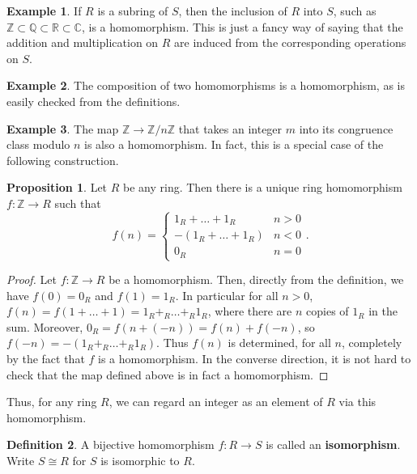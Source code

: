 \documentclass{article}
\newcommand{\Z}{\mathbb{Z}}
\newcommand{\Q}{\mathbb{Q}}
\newcommand{\R}{\mathbb{R}}
\newcommand{\C}{\mathbb{C}}
\newcommand{\rb}[1]{\left( #1 \right)}
\theoremstyle{definition}\newtheorem{definition}{Definition}[section]
\theoremstyle{definition}\newtheorem{remark}[definition]{Remark}
\theoremstyle{definition}\newtheorem*{example}{Example}
\theoremstyle{definition}\newtheorem*{note}{Note}
\newtheorem{proposition}[definition]{Proposition}
\begin{document}
\begin{example}
If $ R $ is a subring of $ S $, then the inclusion of $ R $ into $ S $, such as $ \Z \subset \Q \subset \R \subset \C $, is a homomorphism. This is just a fancy way of saying that the addition and multiplication on $ R $ are induced from the corresponding operations on $ S $.
\end{example}

\begin{example}
The composition of two homomorphisms is a homomorphism, as is easily checked from the definitions.
\end{example}

\begin{example}
The map $ \Z \to \Z / n\Z $ that takes an integer $ m $ into its congruence class modulo $ n $ is also a homomorphism. In fact, this is a special case of the following construction.
\end{example}

\begin{proposition}
Let $ R $ be any ring. Then there is a unique ring homomorphism $ f : \Z \to R $ such that
$$ f\rb{n} = \begin{cases} 1_R + \dots + 1_R & n > 0 \\ -\rb{1_R + \dots + 1_R} & n < 0 \\ 0_R & n = 0 \end{cases}. $$
\end{proposition}

\begin{proof}
Let $ f : \Z \to R $ be a homomorphism. Then, directly from the definition, we have $ f\rb{0} = 0_R $ and $ f\rb{1} = 1_R $. In particular for all $ n > 0 $, $ f\rb{n} = f\rb{1 + \dots + 1} = 1_R +_R \dots +_R 1_R $, where there are $ n $ copies of $ 1_R $ in the sum. Moreover, $ 0_R = f\rb{n + \rb{-n}} = f\rb{n} + f\rb{-n} $, so $ f\rb{-n} = -\rb{1_R +_R \dots +_R 1_R} $. Thus $ f\rb{n} $ is determined, for all $ n $, completely by the fact that $ f $ is a homomorphism. In the converse direction, it is not hard to check that the map defined above is in fact a homomorphism.
\end{proof}

Thus, for any ring $ R $, we can regard an integer as an element of $ R $ via this homomorphism.

\begin{definition}
A bijective homomorphism $ f : R \to S $ is called an \textbf{isomorphism}. Write $ S \cong R $ for $ S $ is isomorphic to $ R $.
\end{definition}
\end{document}
